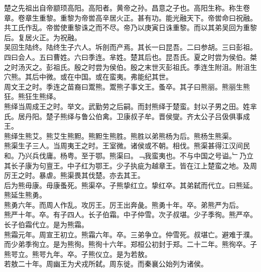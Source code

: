 \documentclass{zhvt-classic}
\begin{document}
\hspace*{2em}楚之先祖出自帝颛顼高阳。高阳者。黄帝之孙。昌意之子也。高阳生称。称生卷章。卷章生重黎。重黎为帝喾高辛居火正。甚有功。能光融天下。帝喾命曰祝融。共工氏作乱。帝喾使重黎诛之而不尽。帝乃以庚寅日诛重黎。而以其弟吴回为重黎后。复居火正。为祝融。\\
\hspace*{2em}吴回生陆终。陆终生子六人。坼剖而产焉。其长一曰昆吾。二曰参胡。三曰彭祖。四曰会人。五曰曹姓。六曰季连。芈姓。楚其后也。昆吾氏。夏之时尝为侯伯。桀之时汤灭之。彭祖氏。殷之时尝为侯伯。殷之末世灭彭祖氏。季连生附沮。附沮生穴熊。其后中微。或在中国。或在蛮夷。弗能纪其世。\\
\hspace*{2em}周文王之时。季连之苗裔曰鬻熊。鬻熊子事文王。蚤卒。其子曰熊丽。熊丽生熊狂。熊狂生熊绎。\\
\hspace*{2em}熊绎当周成王之时。举文。武勤劳之后嗣。而封熊绎于楚蛮。封以子男之田。姓芈氏。居丹阳。楚子熊绎与鲁公伯禽。卫康叔子牟。晋侯燮。齐太公子吕伋俱事成王。\\
\hspace*{2em}熊绎生熊艾。熊艾生熊䵣。熊䵣生熊胜。熊胜以弟熊杨为后。熊杨生熊渠。\\
\hspace*{2em}熊渠生子三人。当周夷王之时。王室微。诸侯或不朝。相伐。熊渠甚得江汉间民和。乃兴兵伐庸。杨粤。至于鄂。熊渠曰。﹁我蛮夷也。不与中国之号谥。﹂乃立其长子康为句亶王。中子红为鄂王。少子执疵为越章王。皆在江上楚蛮之地。及周厉王之时。暴虐。熊渠畏其伐楚。亦去其王。\\
\hspace*{2em}后为熊毋康。毋康蚤死。熊渠卒。子熊挚红立。挚红卒。其弟弑而代立。曰熊延。熊延生熊勇。\\
\hspace*{2em}熊勇六年。而周人作乱。攻厉王。厉王出奔彘。熊勇十年。卒。弟熊严为后。\\
\hspace*{2em}熊严十年。卒。有子四人。长子伯霜。中子仲雪。次子叔堪。少子季徇。熊严卒。长子伯霜代立。是为熊霜。\\
\hspace*{2em}熊霜元年。周宣王初立。熊霜六年。卒。三弟争立。仲雪死。叔堪亡。避难于濮。而少弟季徇立。是为熊徇。熊徇十六年。郑桓公初封于郑。二十二年。熊徇卒。子熊咢立。熊咢九年。卒。子熊仪立。是为若敖。\\
\hspace*{2em}若敖二十年。周幽王为犬戎所弑。周东徙。而秦襄公始列为诸侯。\\
\end{document}
